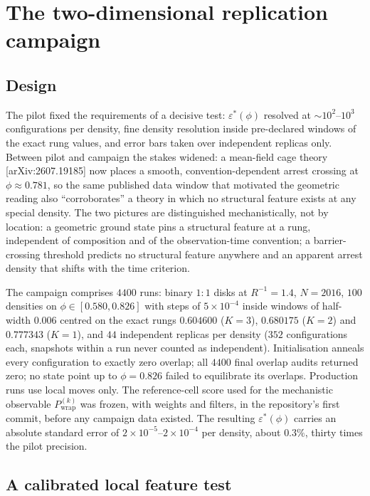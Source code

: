 \documentclass[11pt]{article}
\begin{document}
\section{The two-dimensional replication campaign}
\label{sec:campaign}

\subsection{Design}

The pilot fixed the requirements of a decisive test: $\varepsilon^*(\phi)$
resolved at $\sim10^2$--$10^3$ configurations per density, fine density
resolution inside pre-declared windows of the exact rung values, and error
bars taken over independent replicas only. Between pilot and campaign the
stakes widened: a mean-field cage theory [arXiv:2607.19185] now places a
smooth, convention-dependent arrest crossing at $\phi\approx0.781$, so the
same published data window that motivated the geometric reading also
``corroborates'' a theory in which no structural feature exists at any
special density. The two pictures are distinguished mechanistically, not by
location: a geometric ground state pins a structural feature at a rung,
independent of composition and of the observation-time convention; a
barrier-crossing threshold predicts no structural feature anywhere and an
apparent arrest density that shifts with the time criterion.

The campaign comprises $4400$ runs: binary $1{:}1$ disks at $R^{-1}=1.4$,
$N=2016$, $100$ densities on $\phi\in[0.580,0.826]$ with steps of
$5\times10^{-4}$ inside windows of half-width $0.006$ centred on the exact
rungs $0.604600$ ($K{=}3$), $0.680175$ ($K{=}2$) and $0.777343$ ($K{=}1$),
and $44$ independent replicas per density ($352$ configurations each,
snapshots within a run never counted as independent). Initialisation anneals
every configuration to exactly zero overlap; all $4400$ final overlap audits
returned zero; no state point up to $\phi=0.826$ failed to equilibrate its
overlaps. Production runs use local moves only. The reference-cell score
used for the mechanistic observable $P^{(k)}_{\mathrm{wrap}}$ was frozen,
with weights and filters, in the repository's first commit, before any
campaign data existed. The resulting $\varepsilon^*(\phi)$ carries an
absolute standard error of $2\times10^{-5}$--$2\times10^{-4}$ per density,
about $0.3\%$, thirty times the pilot precision.

\subsection{A calibrated local feature test}
\end{document}
